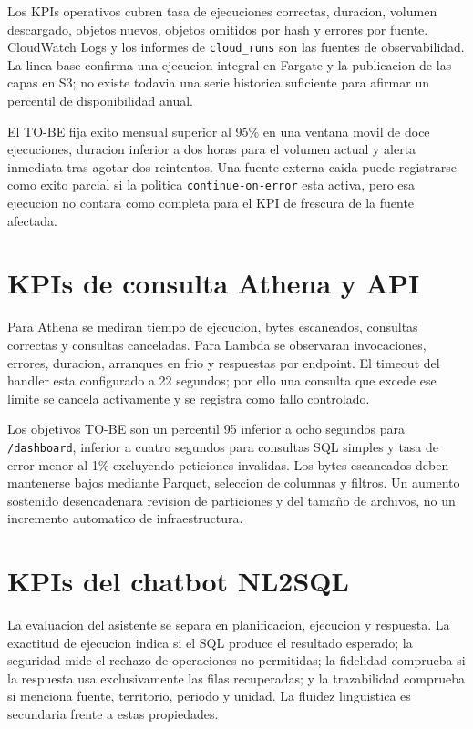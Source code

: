 Los KPIs operativos cubren tasa de ejecuciones correctas, duracion, volumen descargado, objetos nuevos, objetos omitidos por hash y errores por fuente. CloudWatch Logs y los informes de \texttt{cloud\_runs} son las fuentes de observabilidad. La linea base confirma una ejecucion integral en Fargate y la publicacion de las capas en S3; no existe todavia una serie historica suficiente para afirmar un percentil de disponibilidad anual.

El TO-BE fija exito mensual superior al 95\% en una ventana movil de doce ejecuciones, duracion inferior a dos horas para el volumen actual y alerta inmediata tras agotar dos reintentos. Una fuente externa caida puede registrarse como exito parcial si la politica \texttt{continue-on-error} esta activa, pero esa ejecucion no contara como completa para el KPI de frescura de la fuente afectada.

\section{KPIs de consulta Athena y API}

Para Athena se mediran tiempo de ejecucion, bytes escaneados, consultas correctas y consultas canceladas. Para Lambda se observaran invocaciones, errores, duracion, arranques en frio y respuestas por endpoint. El timeout del handler esta configurado a 22 segundos; por ello una consulta que excede ese limite se cancela activamente y se registra como fallo controlado.

Los objetivos TO-BE son un percentil 95 inferior a ocho segundos para \texttt{/dashboard}, inferior a cuatro segundos para consultas SQL simples y tasa de error menor al 1\% excluyendo peticiones invalidas. Los bytes escaneados deben mantenerse bajos mediante Parquet, seleccion de columnas y filtros. Un aumento sostenido desencadenara revision de particiones y del tamaño de archivos, no un incremento automatico de infraestructura.

\section{KPIs del chatbot NL2SQL}

La evaluacion del asistente se separa en planificacion, ejecucion y respuesta. La exactitud de ejecucion indica si el SQL produce el resultado esperado; la seguridad mide el rechazo de operaciones no permitidas; la fidelidad comprueba si la respuesta usa exclusivamente las filas recuperadas; y la trazabilidad comprueba si menciona fuente, territorio, periodo y unidad. La fluidez linguistica es secundaria frente a estas propiedades.

